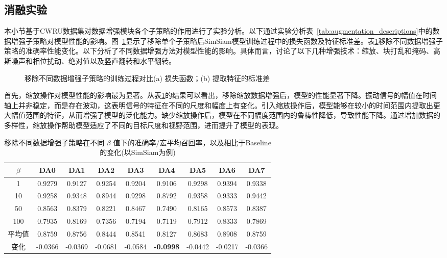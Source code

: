 \documentclass[master]{thesis-uestc}
\begin{document}
\subsection{消融实验}
本小节基于CWRU数据集对数据增强模块各个子策略的作用进行了实验分析。以下通过实验分析表~\ref{tab:augmentation_descriptions}中的数据增强子策略对模型性能的影响。图~\ref{train_process_da_discuss}显示了移除单个子策略后SimSiam模型训练过程中的损失函数及特征标准差。表\ref{tb:da_discuss_results}移除不同数据增强子策略的准确率性能变化。以下分析了不同数据增强方法对模型性能的影响。具体而言，讨论了以下几种增强技术：缩放、块打乱和掩码、高斯噪声和相位扰动、绝对值以及竖直翻转和水平翻转。

\begin{figure}[H]
    \centering
    \caption{移除不同数据增强子策略的训练过程对比(a) 损失函数；(b) 提取特征的标准差}
    \label{train_process_da_discuss}
\end{figure}

首先，缩放操作对模型性能的影响最为显著。从表\ref{tb:da_discuss_results}的结果可以看出，移除缩放数据增强后，模型的性能显著下降。振动信号的幅值在时间轴上并非稳定，而是存在波动，这表明信号的特征在不同的尺度和幅度上有变化。引入缩放操作后，模型能够在较小的时间范围内提取出更大幅值范围的特征，从而增强了模型的泛化能力。缺少缩放操作后，模型在不同幅度范围内的鲁棒性降低，导致性能下降。通过增加数据的多样性，缩放操作帮助模型适应了不同的目标尺度和视野范围，进而提升了模型的表现。

\begin{table}[H]
    \caption{移除不同数据增强子策略在不同 $\beta$ 值下的准确率/宏平均召回率，以及相比于Baseline的变化(以SimSiam为例)}
    \centering
    \begin{tabular}{ccccccccc}
    \toprule
    $\beta$  & DA0 & DA1 & DA2 & DA3 & DA4 & DA5 & DA6 & DA7 \\
    \midrule
    1   & 0.9279  & 0.9127 & 0.9254 & 0.9204 & 0.9106 & 0.9298 & 0.9394 & 0.9338  \\
    10  & 0.9258  & 0.9348 & 0.8944 & 0.9298 & 0.8792 & 0.9358 & 0.9333 & 0.9442  \\
    50  & 0.8563  & 0.8379 & 0.8221 & 0.8467 & 0.7490 & 0.8165 & 0.8573 & 0.8387  \\
    100 & 0.7935  & 0.8169 & 0.7356 & 0.7194 & 0.7119 & 0.7912 & 0.8333 & 0.7869  \\
    \midrule
    平均值 & 0.8759 & 0.8756 & 0.8444 & 0.8541 & 0.8127 & 0.8683 & 0.8908 & 0.8759 \\
    \midrule
    变化 & -0.0366 & -0.0369 & -0.0681 & -0.0584 & \textbf{-0.0998} & -0.0442 & -0.0217 & -0.0366 \\
    \bottomrule
    \end{tabular}
    \label{tb:da_discuss_results}
\end{table}
\end{document}
